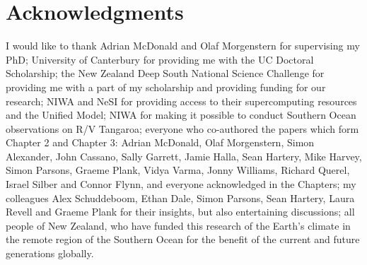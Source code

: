 \chapter*{Acknowledgments}

I would like to thank
Adrian McDonald and Olaf Morgenstern for supervising my PhD;
University of Canterbury for providing me with the UC Doctoral Scholarship;
the New Zealand Deep South National Science Challenge for providing me with a
part of my scholarship and providing funding for our research;
NIWA and NeSI for providing access to their supercomputing resources and the Unified Model;
NIWA for making it possible to conduct Southern Ocean observations on R/V Tangaroa;
everyone who co-authored the papers which form Chapter 2 and Chapter 3:
Adrian McDonald, Olaf Morgenstern, Simon Alexander, John Cassano,
Sally Garrett, Jamie Halla, Sean Hartery, Mike Harvey, Simon Parsons, Graeme Plank,
Vidya Varma, Jonny Williams, Richard Querel, Israel Silber and Connor Flynn,
and everyone acknowledged in the Chapters;
my colleagues Alex Schuddeboom, Ethan Dale, Simon Parsons, Sean Hartery, Laura Revell and Graeme Plank for their insights, but also entertaining discussions;
all people of New Zealand, who have funded this research of the Earth's climate
in the remote region of the Southern Ocean for the benefit of the current and
future generations globally.

